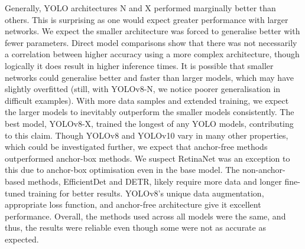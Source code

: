 Generally, YOLO architectures N and X performed marginally better than others. This is surprising as one would expect greater performance with larger networks. We expect the smaller architecture was forced to generalise better with fewer parameters. Direct model comparisons show that there was not necessarily a correlation between higher accuracy using a more complex architecture, though logically it does result in higher inference times. It is possible that smaller networks could generalise better and faster than larger models, which may have slightly overfitted (still, with YOLOv8-N, we notice poorer generalisation in difficult examples). With more data samples and extended training, we expect the larger models to inevitably outperform the smaller models consistently. The best model, YOLOv8-X, trained the longest of any YOLO models, contributing to this claim. Though YOLOv8 and YOLOv10 vary in many other properties, which could be investigated further, we expect that anchor-free methods outperformed anchor-box methods. We suspect RetinaNet was an exception to this due to anchor-box optimisation even in the base model. The non-anchor-based methods, EfficientDet and DETR, likely require more data and longer fine-tuned training for better results. YOLOv8's unique data augmentation, appropriate loss function, and anchor-free architecture give it excellent performance. Overall, the methods used across all models were the same, and thus, the results were reliable even though some were not as accurate as expected. 

